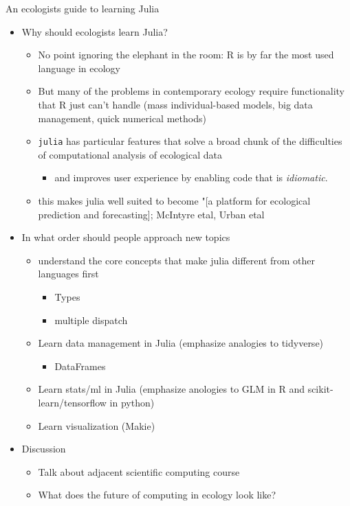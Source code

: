 \documentclass[10pt,oneside]{article}
\begin{document}
An ecologists guide to learning Julia

\begin{itemize}
\tightlist
\item
  Why should ecologists learn Julia?

  \begin{itemize}
  \tightlist
  \item
    No point ignoring the elephant in the room: R is by far the most
    used language in ecology
  \item
    But many of the problems in contemporary ecology require
    functionality that R just can't handle (mass individual-based
    models, big data management, quick numerical methods)
  \item
    \texttt{julia} has particular features that solve a broad chunk of
    the difficulties of computational analysis of ecological data

    \begin{itemize}
    \tightlist
    \item
      and improves user experience by enabling code that is
      \emph{idiomatic}.
    \end{itemize}
  \item
    this makes julia well suited to become "{[}a platform for ecological
    prediction and forecasting{]}; McIntyre etal, Urban etal
  \end{itemize}
\item
  In what order should people approach new topics

  \begin{itemize}
  \tightlist
  \item
    understand the core concepts that make julia different from other
    languages first

    \begin{itemize}
    \tightlist
    \item
      Types
    \item
      multiple dispatch
    \end{itemize}
  \item
    Learn data management in Julia (emphasize analogies to tidyverse)

    \begin{itemize}
    \tightlist
    \item
      DataFrames
    \end{itemize}
  \item
    Learn stats/ml in Julia (emphasize anologies to GLM in R and
    scikit-learn/tensorflow in python)
  \item
    Learn visualization (Makie)
  \end{itemize}
\item
  Discussion

  \begin{itemize}
  \tightlist
  \item
    Talk about adjacent scientific computing course
  \item
    What does the future of computing in ecology look like?
  \end{itemize}
\end{itemize}
\end{document}
